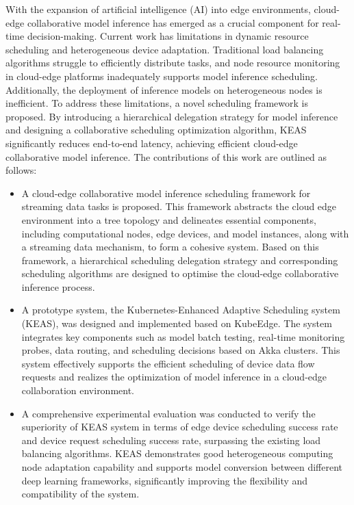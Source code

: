\begin{abstract*}

With the expansion of artificial intelligence (AI) into edge environments, cloud-edge collaborative model inference has emerged as a crucial component for real-time decision-making. Current work has limitations in dynamic resource scheduling and heterogeneous device adaptation. Traditional load balancing algorithms struggle to efficiently distribute tasks, and node resource monitoring in cloud-edge platforms inadequately supports model inference scheduling. Additionally, the deployment of inference models on heterogeneous nodes is inefficient. To address these limitations, a novel scheduling framework is proposed. By introducing a hierarchical delegation strategy for model inference and designing a collaborative scheduling optimization algorithm, KEAS significantly reduces end-to-end latency, achieving efficient cloud-edge collaborative model inference. The contributions of this work are outlined as follows:

\begin{itemize}
    \item A cloud-edge collaborative model inference scheduling framework for streaming data tasks is proposed. This framework abstracts the cloud edge environment into a tree topology and delineates essential components, including computational nodes, edge devices, and model instances, along with a streaming data  mechanism, to form a cohesive system. Based on this framework, a hierarchical scheduling delegation strategy and corresponding scheduling algorithms are designed to optimise the cloud-edge collaborative inference process.
    \item A prototype system, the Kubernetes-Enhanced Adaptive Scheduling system (KEAS), was designed and implemented based on KubeEdge. The system integrates key components such as model batch testing, real-time monitoring probes, data routing, and scheduling decisions based on Akka clusters. This system effectively supports the efficient scheduling of device data flow requests and realizes the optimization of model inference in a cloud-edge collaboration environment.
    \item A comprehensive experimental evaluation was conducted to verify the superiority of KEAS system in terms of edge device scheduling success rate and device request scheduling success rate, surpassing the existing load balancing algorithms. KEAS demonstrates good heterogeneous computing node adaptation capability and supports model conversion between different deep learning frameworks, significantly improving the flexibility and compatibility of the system.
\end{itemize}

\end{abstract*}



